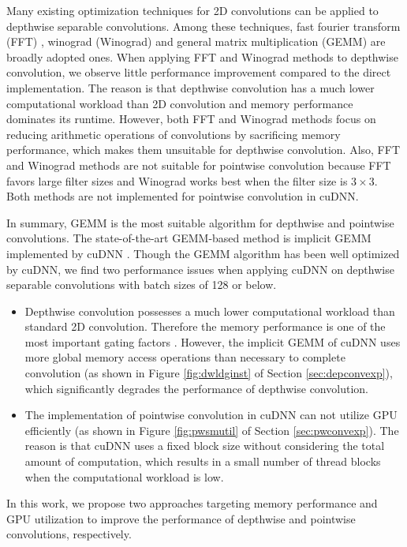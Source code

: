 Many existing optimization techniques \cite{li2016optimizing,Zhen2018Optimizing,enfedaque2014implementation,liu2019optimizing,winter2019adaptive,vasilache2014fast,lavin2016fast,Vasudevan2017Parallel,Chellapilla2006High} for 2D convolutions can be applied to depthwise separable convolutions.
Among these techniques, fast fourier transform (FFT) \cite{vasilache2014fast}, winograd (Winograd) \cite{lavin2016fast} and general matrix multiplication (GEMM) \cite{Vasudevan2017Parallel,Chellapilla2006High} are broadly adopted ones.
When applying FFT and Winograd methods to depthwise convolution, we observe little performance improvement compared to the direct implementation.
The reason is that depthwise convolution has a much lower computational workload than 2D convolution and memory performance dominates its runtime.
However, both FFT and Winograd methods focus on reducing arithmetic operations of convolutions by sacrificing memory performance, which makes them unsuitable for depthwise convolution.
Also, FFT and Winograd methods are not suitable for pointwise convolution because FFT favors large filter sizes and Winograd works best when the filter size is $3 \times 3$. Both methods are not implemented for pointwise convolution in cuDNN.

In summary, GEMM is the most suitable algorithm for depthwise and pointwise convolutions.
The state-of-the-art GEMM-based method is implicit GEMM implemented by cuDNN \cite{ChetlurWVCTCS14}.
Though the GEMM algorithm has been well optimized by cuDNN, we find two performance issues when applying cuDNN on depthwise separable convolutions with batch sizes of 128 or below.
\begin{itemize}
    \item Depthwise convolution possesses a much lower computational workload than standard 2D convolution. Therefore the memory performance is one of the most important gating factors \cite{cudaperformance}.
    However, the implicit GEMM of cuDNN uses more global memory access operations than necessary to complete convolution (as shown in Figure \ref{fig:dwldginst} of Section \ref{sec:depconvexp}), which significantly degrades the performance of depthwise convolution.
    \item The implementation of pointwise convolution in cuDNN can not utilize GPU efficiently (as shown in Figure \ref{fig:pwsmutil} of Section \ref{sec:pwconvexp}).
    The reason is that cuDNN uses a fixed block size without considering the total amount of computation, which results in a small number of thread blocks when the computational workload is low.
\end{itemize}
In this work, we propose two approaches targeting memory performance and GPU utilization to improve the performance of depthwise and pointwise convolutions, respectively.


